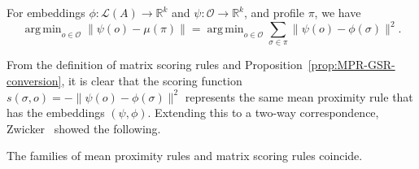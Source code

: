 \documentclass[prodmode]{acmsmall-ec14}
\newcommand{\calL}{{\mathcal{L}}}
\newcommand{\rank}{{\calL(A)}}
\newcommand{\calO}{{\mathcal{O}}}
\DeclareMathOperator*{\argmin}{arg\,min}
\begin{document}
\begin{proposition}
For embeddings $\phi : \rank \rightarrow \mathbb{R}^k$ and $\psi: \calO \to \mathbb{R}^k$, and profile $\pi$, we have
\begin{equation}
\argmin_{o \in \calO} \|\psi(o)-\mu(\pi)\| = \argmin_{o \in \calO} \sum_{\sigma \in \pi} \|\psi(o)-\phi(\sigma)\|^2.
\label{eqn:discrete-mean}
\end{equation}
\label{prop:MPR-GSR-conversion}
\end{proposition}
%
From the definition of matrix scoring rules and Proposition~\ref{prop:MPR-GSR-conversion}, it is clear that the scoring function $s(\sigma,o) = -\|\psi(o)-\phi(\sigma)\|^2$ represents the same mean proximity rule that has the embeddings $(\psi,\phi)$. Extending this to a two-way correspondence, Zwicker~ showed the following. 
\begin{proposition}
The families of mean proximity rules and matrix scoring rules coincide. 
\label{prop:equiv}
\end{proposition}
\end{document}
